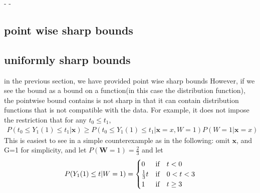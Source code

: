 \documentclass{article}
\begin{document}
        - 
    - 
























\subsection{point wise sharp bounds}
\subsection{uniformly sharp bounds}
in the previous section, we have provided point wise sharp bounds
However, if we see the bound as a bound on a function(in this case the distribution function), the pointwise bound contains is not sharp in that it can contain distribution functions that is not compatible with the data. 
For example, it does not impose the restriction that for any $ t_0 \le t_1$, 
\begin{align}
\label{eq: partial id necc dist sharp}
    P( t_0 \leq Y_1(1) \leq t_1 | \mathbf{x} ) \geq P ( t_0 \leq Y_1(1) \leq t_1 | \mathbf{x} = x, W = 1) P ( W =1 | \mathbf{x} = x)
\end{align}
This is easiest to see in a simple counterexample as in the following: 
omit $\mathbf{x}$, and G=1 for simplicity, and let $P ( \mathbf{W} = 1 ) = \frac{2}{3} $ and let 
\begin{align}
    P (Y_1(1) \leq t | W=1)=
    \begin{cases}
    0&\text{if}\quad t<0\\
    \frac{1}{3}t&\text{if}\quad 0< t< 3\\
    1 & \text{if}\quad t \geq 3
    \end{cases}
\end{align}
\end{document}
